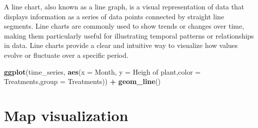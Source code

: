 \documentclass[
]{book}
\newenvironment{Shaded}{\begin{snugshade}}{\end{snugshade}}
\newcommand{\AttributeTok}[1]{\textcolor[rgb]{0.13,0.29,0.53}{#1}}
\newcommand{\FunctionTok}[1]{\textcolor[rgb]{0.13,0.29,0.53}{\textbf{#1}}}
\newcommand{\NormalTok}[1]{#1}
\newcommand{\SpecialCharTok}[1]{\textcolor[rgb]{0.81,0.36,0.00}{\textbf{#1}}}
\newcommand{\StringTok}[1]{\textcolor[rgb]{0.31,0.60,0.02}{#1}}
\begin{document}
A line chart, also known as a line graph, is a visual representation of data that displays information as a series of data points connected by straight line segments. Line charts are commonly used to show trends or changes over time, making them particularly useful for illustrating temporal patterns or relationships in data. Line charts provide a clear and intuitive way to visualize how values evolve or fluctuate over a specific period.

\begin{Shaded}
\begin{Highlighting}[]
\FunctionTok{ggplot}\NormalTok{(time\_series, }\FunctionTok{aes}\NormalTok{(}\AttributeTok{x =}\NormalTok{ Month, }\AttributeTok{y =} \StringTok{\textasciigrave{}}\AttributeTok{Heigh of plant}\StringTok{\textasciigrave{}}\NormalTok{,}\AttributeTok{color =}\NormalTok{ Treatments,}\AttributeTok{group =}\NormalTok{ Treatments)) }\SpecialCharTok{+}
  \FunctionTok{geom\_line}\NormalTok{()}
\end{Highlighting}
\end{Shaded}

\hypertarget{map-visualization}{%
\section{Map visualization}\label{map-visualization}}
\end{document}

